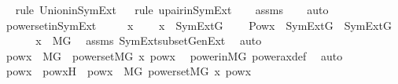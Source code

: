 \begin{isabellebody}
\ \ \isamarkupfalse%
{\isacharparenleft}{\kern0pt}rule\ Union{\isacharunderscore}{\kern0pt}in{\isacharunderscore}{\kern0pt}SymExt{\isacharparenright}{\kern0pt}\isanewline
\ \ \isamarkupfalse%
{\isacharparenleft}{\kern0pt}rule\ upair{\isacharunderscore}{\kern0pt}in{\isacharunderscore}{\kern0pt}SymExt{\isacharparenright}{\kern0pt}\isanewline
\ \ \isamarkupfalse%
\ assms\isanewline
\ \ \isamarkupfalse%
\ auto%
\endisatagproof
{\isafoldproof}%
%
\isadelimproof
\isanewline
%
\endisadelimproof
\isanewline
{}\isamarkupfalse%
\ powerset{\isacharunderscore}{\kern0pt}in{\isacharunderscore}{\kern0pt}SymExt\ {\isacharcolon}{\kern0pt}\ \isanewline
\ \ \ x\ \isanewline
\ \ \ {\isachardoublequoteopen}x\ {\isasymin}\ SymExt{\isacharparenleft}{\kern0pt}G{\isacharparenright}{\kern0pt}{\isachardoublequoteclose}\ \isanewline
\ \ \ {\isachardoublequoteopen}Pow{\isacharparenleft}{\kern0pt}x{\isacharparenright}{\kern0pt}\ {\isasyminter}\ SymExt{\isacharparenleft}{\kern0pt}G{\isacharparenright}{\kern0pt}\ {\isasymin}\ SymExt{\isacharparenleft}{\kern0pt}G{\isacharparenright}{\kern0pt}{\isachardoublequoteclose}\ \isanewline
%
\isadelimproof
%
\endisadelimproof
%
\isatagproof
{}\isamarkupfalse%
\ {\isacharminus}{\kern0pt}\ \isanewline
\ \ \isamarkupfalse%
\ {\isachardoublequoteopen}x\ {\isasymin}\ M{\isacharbrackleft}{\kern0pt}G{\isacharbrackright}{\kern0pt}{\isachardoublequoteclose}\ \isamarkupfalse%
\ assms\ SymExt{\isacharunderscore}{\kern0pt}subset{\isacharunderscore}{\kern0pt}GenExt\ \isamarkupfalse%
\ auto\isanewline
\ \ \isamarkupfalse%
\ \isamarkupfalse%
\ {\isachardoublequoteopen}{\isasymexists}powx\ {\isasymin}\ M{\isacharbrackleft}{\kern0pt}G{\isacharbrackright}{\kern0pt}\ {\isachardot}{\kern0pt}\ powerset{\isacharparenleft}{\kern0pt}{\isacharhash}{\kern0pt}{\isacharhash}{\kern0pt}M{\isacharbrackleft}{\kern0pt}G{\isacharbrackright}{\kern0pt}{\isacharcomma}{\kern0pt}\ x{\isacharcomma}{\kern0pt}\ powx{\isacharparenright}{\kern0pt}{\isachardoublequoteclose}\ \isamarkupfalse%
\ power{\isacharunderscore}{\kern0pt}in{\isacharunderscore}{\kern0pt}MG\ power{\isacharunderscore}{\kern0pt}ax{\isacharunderscore}{\kern0pt}def\ \isamarkupfalse%
\ auto\isanewline
\ \ \isamarkupfalse%
\ \isamarkupfalse%
\ powx\ \ powxH\ {\isacharcolon}{\kern0pt}\ {\isachardoublequoteopen}powx\ {\isasymin}\ M{\isacharbrackleft}{\kern0pt}G{\isacharbrackright}{\kern0pt}{\isachardoublequoteclose}\ {\isachardoublequoteopen}powerset{\isacharparenleft}{\kern0pt}{\isacharhash}{\kern0pt}{\isacharhash}{\kern0pt}M{\isacharbrackleft}{\kern0pt}G{\isacharbrackright}{\kern0pt}{\isacharcomma}{\kern0pt}\ x{\isacharcomma}{\kern0pt}\ powx{\isacharparenright}{\kern0pt}{\isachardoublequoteclose}\ \isamarkupfalse%

\end{isabellebody}
